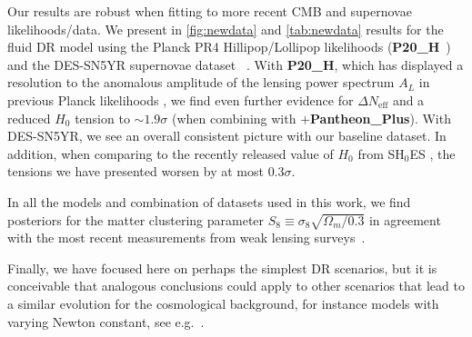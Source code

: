\documentclass[aps,prd,twocolumn,notitlepage,
superscriptaddress,
nofootinbib,floatfix]{revtex4-2}
\newcommand{\planck}{\textbf{P18}}
\newcommand{\planckhilli}{\textbf{P20\_H}}
\newcommand{\desi}{$\mathbf{+}$\textbf{DESI}}
\newcommand{\pantheon}{$\mathbf{+}${\bf Pantheon\_Plus}}
\newcommand{\DES}{$\mathbf{+}$\textbf{DES-SN5YR}}
\newcommand{\DNeff}{\Delta N_\text{eff}}
\begin{document}
Our results are robust when fitting to more recent CMB and supernovae likelihoods/data. We present in \cref{fig:newdata} and \cref{tab:newdata} results for the fluid DR model using the Planck PR4 Hillipop/Lollipop likelihoods (\planckhilli~\cite{Tristram:2023haj}) and the DES-SN5YR supernovae dataset ~\cite{DES:2024tys}. With \planckhilli, which has displayed a resolution to the anomalous amplitude of the lensing power spectrum $A_L$ in previous Planck likelihoods \cite{Addison:2023fqc}, we find even further evidence for $\DNeff$ and a reduced $H_0$ tension to $\sim 1.9 \sigma$ (when combining with \pantheon). With DES-SN5YR, we see an overall consistent picture with our baseline dataset. In addition, when comparing to the recently released value of $H_0$ from SH$_0$ES \cite{Breuval:2024lsv}, the tensions we have presented worsen by at most $0.3\sigma$.





In all the models and combination of datasets used in this work, we find posteriors for the matter clustering parameter $S_8\equiv \sigma_8\sqrt{\Omega_m/0.3}$ in agreement with the most recent measurements from weak lensing surveys~\cite{Kilo-DegreeSurvey:2023gfr}.


Finally, we have focused here on perhaps the simplest DR scenarios, but it is conceivable that analogous conclusions could apply to other scenarios that lead to a similar evolution for the cosmological background, for instance models with varying Newton constant, see e.g.~\cite{Ballesteros:2020sik}.
\end{document}
